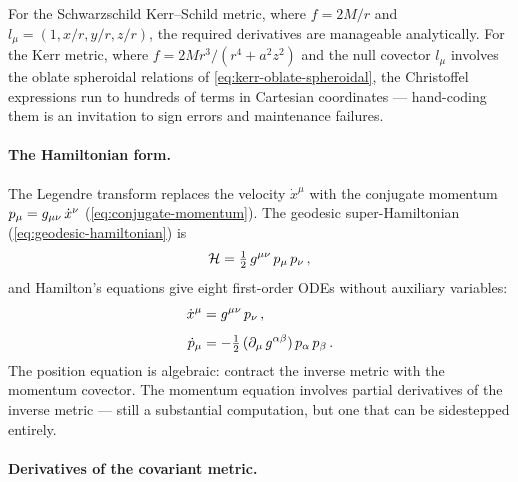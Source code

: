For the Schwarzschild Kerr--Schild metric, where $f = 2M/r$ and
$l_\mu = (1, x/r, y/r, z/r)$, the required derivatives are manageable
analytically.  For the Kerr metric, where
$f = 2Mr^3/(r^4 + a^2 z^2)$ and the null covector $l_\mu$ involves the
oblate spheroidal relations of \cref{eq:kerr-oblate-spheroidal}, the
Christoffel expressions run to hundreds of terms in Cartesian
coordinates --- hand-coding them is an invitation to sign errors and
maintenance failures.

\paragraph{The Hamiltonian form.}

The Legendre transform replaces the velocity $\dot{x}^\mu$ with the
conjugate momentum $p_\mu = g_{\mu\nu}\,\dot{x}^\nu$
(\cref{eq:conjugate-momentum}).  The geodesic super-Hamiltonian
(\cref{eq:geodesic-hamiltonian}) is
%
\begin{equation}
  \mathcal{H} = \tfrac{1}{2}\,g^{\mu\nu}\,p_\mu\,p_\nu \,,
  \label{eq:geo-hamiltonian}
\end{equation}
%
and Hamilton's equations give eight first-order ODEs without auxiliary
variables:
%
\begin{align}
  \dot{x}^\mu &= g^{\mu\nu}\,p_\nu \,,
  \label{eq:geo-xdot} \\[4pt]
  \dot{p}_\mu &= -\tfrac{1}{2}\,(\partial_{\mu}\,g^{\alpha\beta})\,
                 p_\alpha\,p_\beta \,.
  \label{eq:geo-pdot}
\end{align}
%
The position equation is algebraic: contract the inverse metric with the
momentum covector.  The momentum equation involves partial derivatives of the
inverse metric --- still a substantial computation, but one that can be
sidestepped entirely.

\paragraph{Derivatives of the covariant metric.}

